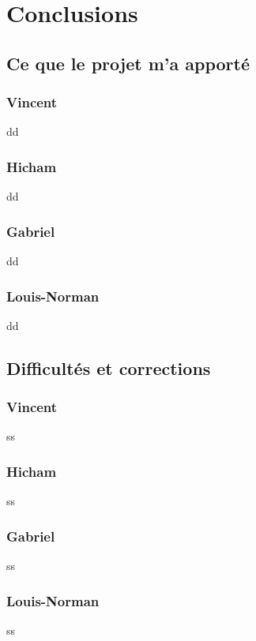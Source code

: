 

\section{Conclusions}
\subsection{Ce que le projet m'a apporté}
\begin{multicols}{4}

\subsubsection{Vincent}
dd
\subsubsection{Hicham}
dd
\subsubsection{Gabriel}
dd
\subsubsection{Louis-Norman}
dd
\end{multicols}

\begin{center}\HRule \end{center}

\subsection{Difficultés et corrections}
\begin{multicols}{4}
\subsubsection{Vincent}
ss
\subsubsection{Hicham}
ss
\subsubsection{Gabriel}
ss
\subsubsection{Louis-Norman}
ss
\end{multicols}

